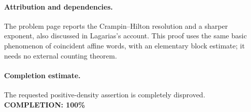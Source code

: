 \paragraph{Attribution and dependencies.}
The problem page reports the Crampin--Hilton resolution and a sharper exponent, also discussed in Lagarias's account. This proof uses the same basic phenomenon of coincident affine words, with an elementary block estimate; it needs no external counting theorem.

\paragraph{Completion estimate.}
The requested positive-density assertion is completely disproved.
\textbf{COMPLETION: 100\%}
